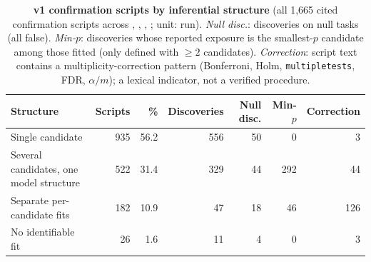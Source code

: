 \begin{table}[h]
\centering
\caption{\textbf{v1 confirmation scripts by inferential structure} (all 1,665 cited confirmation
scripts across , , , ; unit: run). \emph{Null disc.}: discoveries
on null tasks (all false). \emph{Min-$p$}: discoveries whose reported exposure is the smallest-$p$
candidate among those fitted (only defined with $\ge 2$ candidates). \emph{Correction}: script text
contains a multiplicity-correction pattern (Bonferroni, Holm, \texttt{multipletests}, FDR, $\alpha/m$);
a lexical indicator, not a verified procedure.}
\label{tab:taxonomy}
\footnotesize
\begin{tabular}{lrrrrrr}
\toprule
Structure & Scripts & \% & Discoveries & Null disc. & Min-$p$ & Correction\\
\midrule
Single candidate & 935 & 56.2 & 556 & 50 & 0 & 3\\
Several candidates, one model structure & 522 & 31.4 & 329 & 44 & 292 & 44\\
Separate per-candidate fits & 182 & 10.9 & 47 & 18 & 46 & 126\\
No identifiable fit & 26 & 1.6 & 11 & 4 & 0 & 3\\
\bottomrule
\end{tabular}
\end{table}
